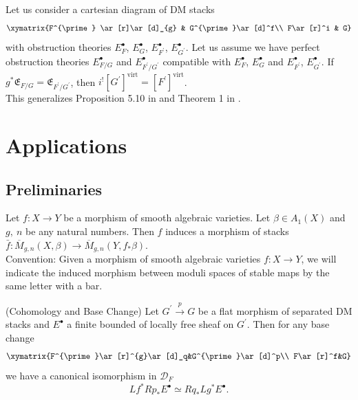 \begin{remark}\label{manolacheVirtualPullbacks2012-rem-4.10}
Let us consider a cartesian diagram of DM stacks
\begin{equation*}
 \xymatrix {F^{\prime} \ar[r]\ar[d]_{g} & G^{\prime}\ar[d]^f\\
             F\ar[r]^i & G}
\end{equation*}
with obstruction theories $E_{F}^{\bullet}$, $E_{G}^{\bullet}$, $E_{F^{\prime}}^{\bullet}$, $E_{G^{\prime}}^{\bullet}$. Let us assume we have perfect obstruction theories $E_{F/G}^{\bullet}$ and $E_{F^{\prime}/G^{\prime}}^{\bullet}$ compatible with  $E_{F}^{\bullet}$, $E_{G}^{\bullet}$ and $E_{F^{\prime}}^{\bullet}$, $E_{G^{\prime}}^{\bullet}$. If $g^*\mathfrak{E}_{F/G}=\mathfrak{E}_{F^{\prime}/G^{\prime}}$, then $i^![G^{\prime}]^{\mathrm{virt}}=[F^{\prime}]^{\mathrm{virt}}$.
\\This generalizes Proposition 5.10 in \cite{bf} and Theorem 1 in \cite{K:01}.
\end{remark}

\section{Applications}\label{manolacheVirtualPullbacks2012-sec-5}

\subsection{Preliminaries}\label{manolacheVirtualPullbacks2012-sec-5.1}

\begin{remark}\label{manolacheVirtualPullbacks2012-rem-5.1}
Let $f: X\to Y$ be a morphism of smooth algebraic varieties. Let $\beta\in A_1(X)$ and $g,\ n$ be any natural numbers. Then $f$ induces a morphism of stacks $\bar{f}: \overline{M}_{g,n}(X,\beta)\to \overline{M}_{g,n}(Y,f_*\beta)$.
\\Convention: Given a morphism of smooth algebraic varieties $f:X\to Y$, we will indicate the induced morphism between moduli spaces of stable maps by the same letter with a bar.
\end{remark}

\begin{theorem}\label{manolacheVirtualPullbacks2012-thm-5.2}
 (Cohomology and Base Change)\label{manolacheVirtualPullbacks2012-grothmaps} Let $G^{\prime}\stackrel{p}{\rightarrow}G$ be a flat morphism of separated DM stacks and $E^{\bullet}$ a finite bounded of locally free sheaf on $G^{\prime}$. Then for any base change
\begin{equation*}
 \xymatrix{F^{\prime}\ar[r]^{g}\ar[d]_q&G^{\prime}\ar[d]^p\\
F\ar[r]^f&G}
\end{equation*}
we have a canonical isomorphism in $\mathcal{D}_F$ $$Lf^*Rp_*E^{\bullet}\simeq Rq_*Lg^*E^{\bullet}.$$
\end{theorem}

